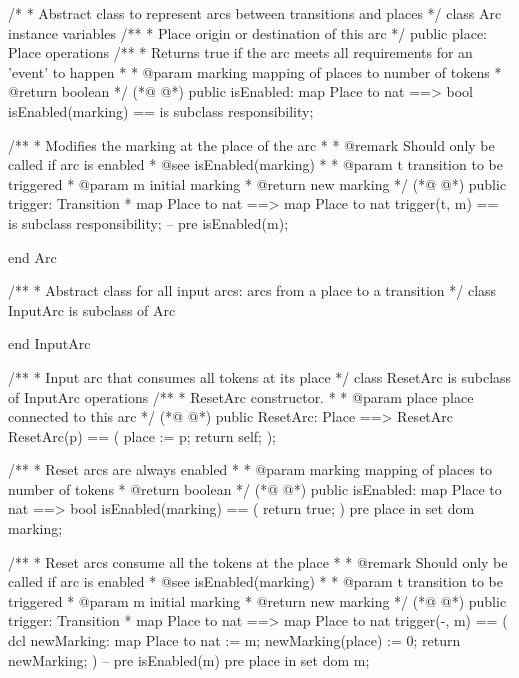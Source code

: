 \begin{vdmpp}
/*
 * Abstract class to represent arcs between transitions and places
 */
class Arc
  instance variables
    /**
     * Place origin or destination of this arc
     */
    public place: Place
  operations
    /**
     * Returns true if the arc meets all requirements for an 'event' to happen
     *
     * @param marking mapping of places to number of tokens
     * @return boolean
     */
(*@
\label{isEnabled:17}
@*)
    public isEnabled: map Place to nat ==> bool
    isEnabled(marking) == is subclass responsibility;

    /**
     * Modifies the marking at the place of the arc
     *
     * @remark Should only be called if arc is enabled
     * @see isEnabled(marking)
     *
     * @param t transition to be triggered
     * @param m initial marking
     * @return new marking
     */
(*@
\label{trigger:30}
@*)
    public trigger: Transition * map Place to nat ==> map Place to nat
    trigger(t, m) == is subclass responsibility;
    -- pre isEnabled(m);

end Arc

/**
 * Abstract class for all input arcs: arcs from a place to a transition
 */
class InputArc is subclass of Arc

end InputArc

/**
 * Input arc that consumes all tokens at its place
 */
class ResetArc is subclass of InputArc
  operations
    /**
     * ResetArc constructor.
     *
     * @param place place connected to this arc
     */
(*@
\label{ResetArc:53}
@*)
    public ResetArc: Place ==> ResetArc
    ResetArc(p) == (
      place := p;
      return self;
    );

    /**
     * Reset arcs are always enabled
     *
     * @param marking mapping of places to number of tokens
     * @return boolean
     */
(*@
\label{isEnabled:65}
@*)
    public isEnabled: map Place to nat ==> bool
    isEnabled(marking) == (
      return true;
    )
    pre place in set dom marking;

    /**
     * Reset arcs consume all the tokens at the place
     *
     * @remark Should only be called if arc is enabled
     * @see isEnabled(marking)
     *
     * @param t transition to be triggered
     * @param m initial marking
     * @return new marking
     */
(*@
\label{trigger:80}
@*)
    public trigger: Transition * map Place to nat ==> map Place to nat
    trigger(-, m) == (
      dcl newMarking: map Place to nat := m;
      newMarking(place) := 0;
      return newMarking;
    )
    -- pre isEnabled(m)
    pre place in set dom m;


\end{vdmpp}

